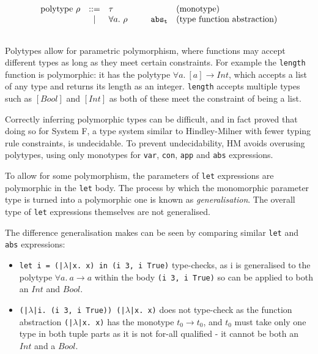 \documentclass[a4paper,fleqn,oneside,12pt]{report}
\begin{document}
$$\begin{array}{lcllll}
  \\
    \textrm{polytype}\ \rho & ::= & \tau            & \hspace{0.25cm} & & \textrm{(monotype)}\\
                          & \vert & \forall a.\ \rho &                 & \mathtt{abs_t} & \textrm{(type function abstraction)}\\
  \\
\end{array}
$$

Polytypes allow for parametric polymorphism, where functions may accept different types as long as they meet certain constraints. For example the \texttt{length} function is polymorphic: it has the polytype $\forall a.\ [a] \rightarrow Int$, which accepts a list of any type and returns its length as an integer. \texttt{length} accepts multiple types such as $[Bool]$ and $[Int]$ as both of these meet the constraint of being a list.

Correctly inferring polymorphic types can be difficult, and in fact \cite{ref14} proved that doing so for System F, a type system similar to Hindley-Milner with fewer typing rule constraints, is undecidable. To prevent undecidability, HM avoids overusing polytypes, using only monotypes for \texttt{var}, \texttt{con}, \texttt{app} and \texttt{abs} expressions.

To allow for some polymorphism, the parameters of \texttt{let} expressions are polymorphic in the \texttt{let} body. The process by which the monomorphic parameter type is turned into a polymorphic one is known as \textit{generalisation}. The overall type of \texttt{let} expressions themselves are not generalised.

The difference generalisation makes can be seen by comparing similar \texttt{let} and \texttt{abs} expressions:
\begin{itemize}
  \item \texttt{let i = (|$\lambda$|x. x) in (i 3, i True)} type-checks, as i is generalised to the polytype $\forall a.\ a \rightarrow a$ within the body \texttt{(i 3, i True)} so can be applied to both an $Int$ and $Bool$.
  \item \texttt{(|$\lambda$|i. (i 3, i True)) (|$\lambda$|x. x)} does not type-check as the function abstraction \texttt{(|$\lambda$|x. x)} has the monotype $t_0 \rightarrow t_0$, and $t_0$ must take only one type in both tuple parts as it is not for-all qualified - it cannot be both an $Int$ and a $Bool$.
\end{itemize}
\end{document}

